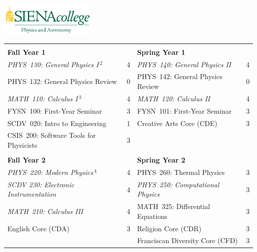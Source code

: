 \documentclass[12pt]{article}
\begin{document}
\hfill \includegraphics[width=0.35\textwidth]{siena_phys_astro_print_crop.jpg}

\vspace{0.1cm}
\vspace{0.3cm}

\vspace*{-5mm}
\begin{table}[h!]
\begin{center}
{\renewcommand{\arraystretch}{1.2}
\begin{tabular*}{0.9\textwidth}{@{\extracolsep{\fill}}lclc}
 & \\
{\Large \textbf{Fall Year 1}} & & {\Large \textbf{Spring Year 1}} & \\
\hline
{\em PHYS~130: General Physics I}\,$^{2}$  & 4 & {\em PHYS~140: General Physics II}     & 4 \\
PHYS~132: General Physics Review           & 0 & PHYS~142: General Physics Review & 0\\
{\em MATH~110: Calculus I}\,$^{3}$         & 4 & {\em MATH~120: Calculus II}            & 4 \\
FYSN~100: First-Year Seminar               & 3 & FYSN~101: First-Year Seminar     & 3\\
SCDV~020: Intro to Engineering             & 1 & Creative Arts Core (CDE)         & 3 \\
CSIS~200: Software Tools for Physicists    & 3 & & \\

 & \\
{\Large \textbf{Fall Year 2}} & & {\Large \textbf{Spring Year 2}} & \\
\hline
{\em PHYS~220: Modern Physics}\,$^{4}$      & 4 & PHYS~260: Thermal Physics        & 3 \\
{\em SCDV 230: Electronic Instrumentation} & 4 & {\em PHYS~250: Computational Physics} & 3  \\
{\em MATH~210: Calculus III}               & 4 & MATH~325: Differential Equations & 3 \\
English Core (CDA)                         & 3 & Religion Core (CDR)            & 3 \\
                                           &   & Franciscan Diversity Core (CFD)  & 3 \\


\end{tabular*}}
\end{center}
\end{table}
\end{document}
